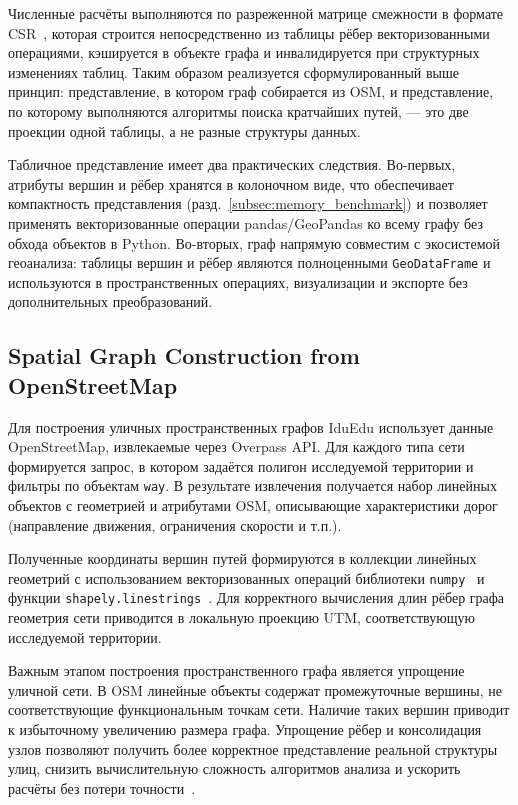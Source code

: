 \documentclass[sigconf,nonacm]{acmart}
\begin{document}
    Численные расчёты выполняются по разреженной матрице смежности в формате CSR~\cite{virtanen2020scipy},
    которая строится непосредственно из таблицы рёбер векторизованными операциями, кэшируется в объекте графа
    и инвалидируется при структурных изменениях таблиц.
    Таким образом реализуется сформулированный выше принцип: представление, в котором граф собирается из OSM,
    и представление, по которому выполняются алгоритмы поиска кратчайших путей, — это две проекции одной таблицы, а не разные структуры данных.

    Табличное представление имеет два практических следствия.
    Во-первых, атрибуты вершин и рёбер хранятся в колоночном виде, что обеспечивает компактность представления (разд.~\ref{subsec:memory_benchmark})
    и позволяет применять векторизованные операции pandas/GeoPandas ко всему графу без обхода объектов в Python.
    Во-вторых, граф напрямую совместим с экосистемой геоанализа: таблицы вершин и рёбер являются полноценными \texttt{GeoDataFrame}
    и используются в пространственных операциях, визуализации и экспорте без дополнительных преобразований.

    \subsection{Spatial Graph Construction from OpenStreetMap}
    \label{subsec:spatial-graph-construction-from-openstreetmap}

    Для построения уличных пространственных графов IduEdu использует данные OpenStreetMap, извлекаемые через Overpass API\@.
    Для каждого типа сети формируется запрос, в котором задаётся полигон исследуемой территории и фильтры по объектам \texttt{way}.
    В результате извлечения получается набор линейных объектов с геометрией и атрибутами OSM, описывающие характеристики дорог
    (направление движения, ограничения скорости и т.п.).

    Полученные координаты вершин путей формируются в коллекции линейных геометрий с использованием векторизованных операций
    библиотеки \texttt{numpy}~\cite{harris2020numpy} и функции \texttt{shapely.linestrings}~\cite{shapely}.
    Для корректного вычисления длин рёбер графа геометрия сети приводится в локальную проекцию UTM, соответствующую исследуемой территории.

    Важным этапом построения пространственного графа является упрощение уличной сети.
    В OSM линейные объекты содержат промежуточные вершины, не соответствующие функциональным точкам сети.
    Наличие таких вершин приводит к избыточному увеличению размера графа.
    Упрощение рёбер и консолидация узлов позволяют получить более корректное представление реальной структуры улиц,
    снизить вычислительную сложность алгоритмов анализа и ускорить расчёты без потери точности~\cite{boeing2025osmnx}.
\end{document}
